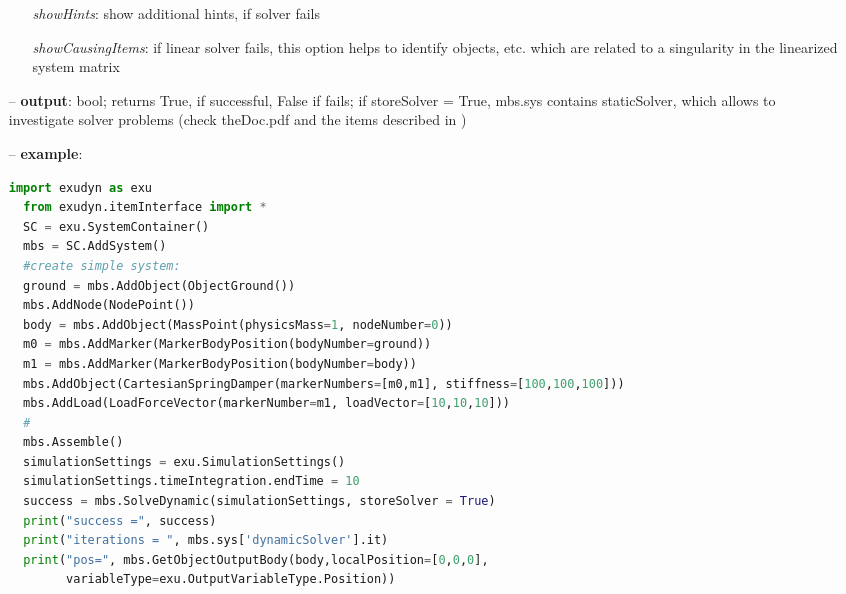 \begin{itemize}[leftmargin=0.7cm]
\begin{itemize}[leftmargin=1.2cm]
\item[]{\it showHints}: show additional hints, if solver fails
\item[]{\it showCausingItems}: if linear solver fails, this option helps to identify objects, etc. which are related to a singularity in the linearized system matrix
\end{itemize}
\item[--]
{\bf output}: bool; returns True, if successful, False if fails; if storeSolver = True, mbs.sys contains staticSolver, which allows to investigate solver problems (check theDoc.pdf  and the items described in )
\item[--]
{\bf example}: \vspace{-12pt}\ei\begin{lstlisting}[language=Python, xleftmargin=36pt]
  import exudyn as exu
  from exudyn.itemInterface import *
  SC = exu.SystemContainer()
  mbs = SC.AddSystem()
  #create simple system:
  ground = mbs.AddObject(ObjectGround())
  mbs.AddNode(NodePoint())
  body = mbs.AddObject(MassPoint(physicsMass=1, nodeNumber=0))
  m0 = mbs.AddMarker(MarkerBodyPosition(bodyNumber=ground))
  m1 = mbs.AddMarker(MarkerBodyPosition(bodyNumber=body))
  mbs.AddObject(CartesianSpringDamper(markerNumbers=[m0,m1], stiffness=[100,100,100]))
  mbs.AddLoad(LoadForceVector(markerNumber=m1, loadVector=[10,10,10]))
  #
  mbs.Assemble()
  simulationSettings = exu.SimulationSettings()
  simulationSettings.timeIntegration.endTime = 10
  success = mbs.SolveDynamic(simulationSettings, storeSolver = True)
  print("success =", success)
  print("iterations = ", mbs.sys['dynamicSolver'].it)
  print("pos=", mbs.GetObjectOutputBody(body,localPosition=[0,0,0],
        variableType=exu.OutputVariableType.Position))
\end{lstlisting}\vspace{-24pt}\bi\item[]\vspace{-24pt}\vspace{12pt}\end{itemize}
%

